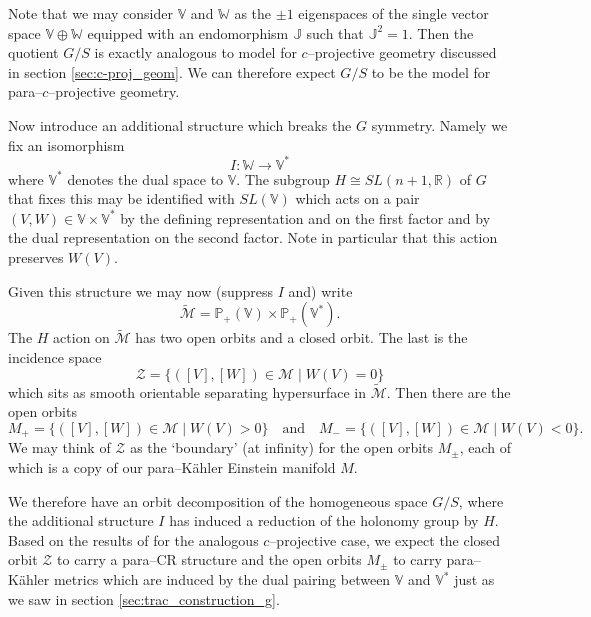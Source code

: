 Note that we may consider $\mathbb{V}$ and $\mathbb{W}$ as the $\pm 1$ eigenspaces of the single vector space $\mathbb{V}\oplus \mathbb{W}$ equipped with an endomorphism
$\mathbb{J}$ such that $\mathbb{J}^2=1$. Then the quotient $G/S$ is exactly analogous to model for $c$--projective geometry discussed in section \ref{sec:c-proj_geom}. We can therefore expect $G/S$ to be the model for para--$c$--projective geometry.


Now introduce an additional structure which breaks the $G$
symmetry. 
Namely we fix an isomorphism
$$
I:\mathbb{W}\to \mathbb{V}^*
$$
where $\mathbb{V}^*$ denotes the dual space to $\mathbb{V}$. The subgroup $H\cong SL(n+1,\mathbb{R})$ of $G$
that fixes this may be identified with $SL(\mathbb{V})$ which acts on a pair
$(V,W)\in \mathbb{V}\times \mathbb{V}^*$ by the defining representation and on the first
factor and by the dual representation on the second factor. Note in particular that this action preserves $W(V)$.

Given this structure we may now (suppress $I$ and) write
$$
\widetilde{\mathcal{M}}= \mathbb{P}_+(\mathbb{V}) \times \mathbb{P}_+(\mathbb{V}^*).
$$
The ${H}$ action on $\widetilde{\mathcal{M}}$ has two open orbits and a closed orbit. The last
is the incidence space 
$$
\mathcal{Z}=\{ ([V],[W])\in \mathcal{M} \mid W(V)=0 \} 
$$
which sits as smooth orientable separating hypersurface in $\widetilde{\mathcal{M}}$. Then there are the open orbits
$$
M_+=\{ ([V],[W])\in \mathcal{M} \mid W(V)>0 \} \quad \mbox{and} \quad
M_-=\{ ([V],[W])\in \mathcal{M} \mid W(V)<0 \}.
$$
We may think of $\mathcal{Z}$ as the `boundary' (at infinity) for the open orbits $M_\pm$, each of which is a copy of our para--K\"ahler Einstein manifold $M$.

We therefore have an orbit decomposition of the homogeneous space $G/S$, where the additional structure $I$ has induced a reduction of the holonomy group by ${H}$. Based on the results of \cite{CGH-duke} for the analogous $c$--projective case, we expect the closed orbit $\mathcal{Z}$ to carry a para--CR structure and the open orbits $M_\pm$ to carry para--K\"ahler metrics which are induced by the dual pairing between $\mathbb{V}$ and $\mathbb{V}^*$ just as we saw in section \ref{sec:trac_construction_g}.




